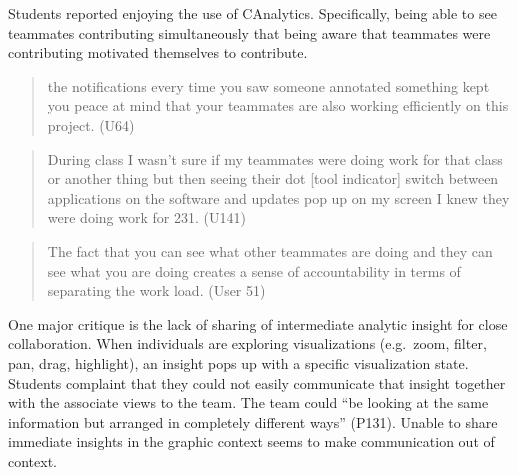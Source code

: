 Students reported enjoying the use of CAnalytics. Specifically, being
able to see teammates contributing simultaneously that being aware that
teammates were contributing motivated themselves to contribute.

\begin{quote}
the notifications every time you saw someone annotated something kept
you peace at mind that your teammates are also working efficiently on
this project. (U64)
\end{quote}

\begin{quote}
During class I wasn't sure if my teammates were doing work for that
class or another thing but then seeing their dot {[}tool indicator{]}
switch between applications on the software and updates pop up on my
screen I knew they were doing work for 231. (U141)
\end{quote}

\begin{quote}
The fact that you can see what other teammates are doing and they can
see what you are doing creates a sense of accountability in terms of
separating the work load. (User 51)
\end{quote}

One major critique is the lack of sharing of intermediate analytic
insight for close collaboration. When individuals are exploring
visualizations (e.g.~zoom, filter, pan, drag, highlight), an insight
pops up with a specific visualization state. Students complaint that
they could not easily communicate that insight together with the
associate views to the team. The team could ``be looking at the same
information but arranged in completely different ways'' (P131). Unable
to share immediate insights in the graphic context seems to make
communication out of context.